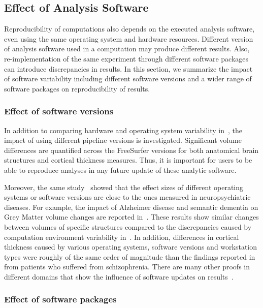 \subsection{Effect of Analysis Software}

Reproducibility of computations also depends on the executed analysis 
software, even using the same operating system and hardware resources. 
Different version of analysis software used in a computation may 
produce different results. Also, re-implementation of the same 
experiment through different software packages can introduce 
discrepancies in results. In this section, we summarize the impact of 
software variability including different software versions and a wider 
range of software packages on reproducibility of results. 

\subsubsection{Effect of software versions} 

In addition to comparing hardware and operating system variability 
in~\cite{Gronenschild2012}, the impact of using different pipeline 
versions is investigated.
Significant volume differences are quantified across the FreeSurfer 
versions for both anatomical brain structures and cortical thickness 
measures. Thus, it is important for users to be able to reproduce 
analyses in any future update of these analytic software. 

Moreover, the same study~\cite{Gronenschild2012} showed that the effect 
sizes of different operating systems or software versions are close to 
the ones measured in neuropsychiatric diseases. For example, the impact 
of Alzheimer disease and semantic dementia on Grey Matter volume 
changes are reported in~\cite{lehmann2010atrophy}. These results show 
similar changes between volumes of specific structures compared to 
the discrepancies caused by computation environment variability 
in~\cite{Gronenschild2012}. In addition, differences in cortical 
thickness caused by various operating systems, software versions and 
workstation types were roughly of the same order of magnitude than the 
findings reported in~\cite{kuperberg2003regionally} from patients who 
suffered from schizophrenia. There are many other proofs in different 
domains that show the influence of software updates on  
results~\cite{shim2015effect, wadi2016impact}.

\subsubsection{Effect of software packages} 
\label{swf_effect}

